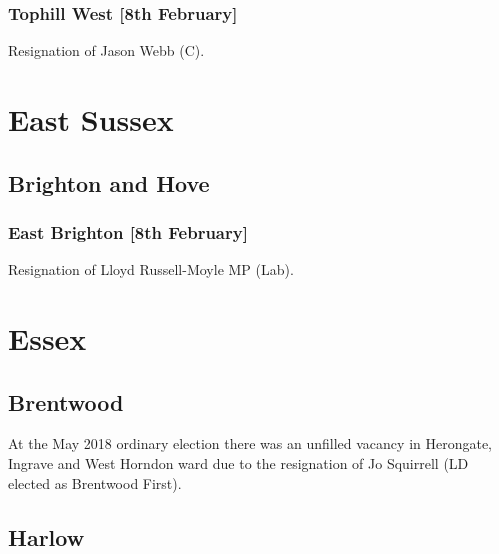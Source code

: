 \documentclass[a4paper,openany]{book}
\begin{document}
\begin{resultsiii}
\subsubsection*{Tophill West \hspace*{\fill}\nolinebreak[1]%
\enspace\hspace*{\fill}
[8th February]}


Resignation of Jason Webb (C).

\section{East Sussex}

\subsection*{Brighton and Hove}

\subsubsection*{East Brighton \hspace*{\fill}\nolinebreak[1]%
\enspace\hspace*{\fill}
[8th February]}


Resignation of Lloyd Russell-Moyle MP (Lab).

\section{Essex}

\subsection*{Brentwood}

At the May 2018 ordinary election there was an unfilled vacancy in Herongate, Ingrave and West Horndon ward due to the resignation of Jo Squirrell (LD elected as Brentwood First).

\subsection*{Harlow}


\end{resultsiii}
\end{document}
